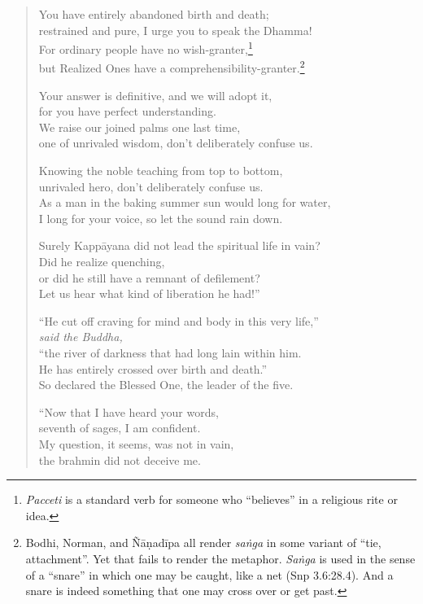 \documentclass[12pt,openany]{book}%
\newcommand*{\scspeaker}[1]{\hspace{2em}\textit{#1}}
\begin{document}
\begin{verse}
You have entirely abandoned birth and death; \\
restrained and pure, I urge you to speak the Dhamma! \\
For ordinary people have no wish-granter,\footnote{\textit{Pacceti} is a standard verb for someone who “believes” in a religious rite or idea. } \\
but Realized Ones have a comprehensibility-granter.\footnote{Bodhi, Norman, and \textsanskrit{Ñāṇadīpa} all render \textit{\textsanskrit{saṅga}} in some variant of “tie, attachment”. Yet that fails to render the metaphor. \textit{\textsanskrit{Saṅga}} is used in the sense of a “snare” in which one may be caught, like a net (Snp 3.6:28.4). And a snare is indeed something that one may cross over or get past. } 

Your answer is definitive, and we will adopt it, \\
for you have perfect understanding. \\
We raise our joined palms one last time, \\
one of unrivaled wisdom, don’t deliberately confuse us. 

Knowing the noble teaching from top to bottom, \\
unrivaled hero, don’t deliberately confuse us. \\
As a man in the baking summer sun would long for water, \\
I long for your voice, so let the sound rain down. 

Surely \textsanskrit{Kappāyana} did not lead the spiritual life in vain? \\
Did he realize quenching, \\
or did he still have a remnant of defilement? \\
Let us hear what kind of liberation he had!” 

“He cut off craving for mind and body in this very life,” \\
\scspeaker{said the Buddha, }\\
“the river of darkness that had long lain within him. \\
He has entirely crossed over birth and death.” \\
So declared the Blessed One, the leader of the five. 

“Now that I have heard your words, \\
seventh of sages, I am confident. \\
My question, it seems, was not in vain, \\
the brahmin did not deceive me. 


\end{verse}
\end{document}
